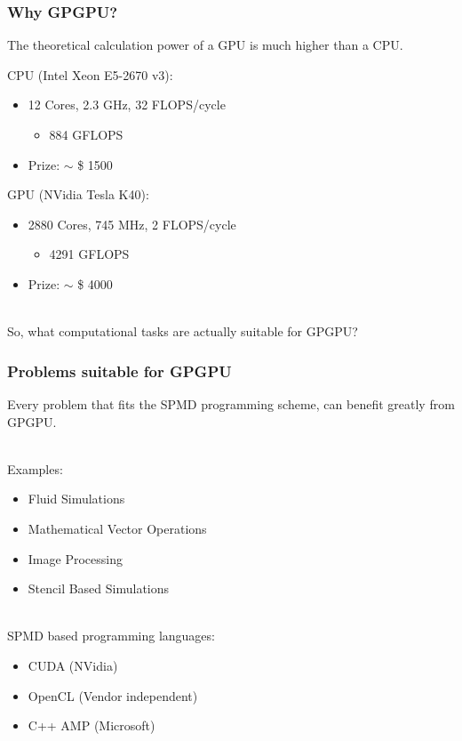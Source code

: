\documentclass{beamer}
\begin{document}
\begin{frame}
    \frametitle{Why GPGPU?}

    The \alert{theoretical} calculation power of a GPU is much higher
    than a CPU.

    \begin{example}
        CPU (Intel Xeon E5-2670 v3):
        \begin{itemize}
            \item 12 Cores, 2.3 GHz, 32 FLOPS/cycle
            \begin{itemize}
                \item \alert{884 GFLOPS}
            \end{itemize}
            \item Prize: $\sim$ \$ \alert{1500}
        \end{itemize}
        GPU (NVidia Tesla K40):
        \begin{itemize}
            \item 2880 Cores, 745 MHz, 2 FLOPS/cycle
            \begin{itemize}
                \item \alert{4291 GFLOPS}
            \end{itemize}
            \item Prize: $\sim$ \$ \alert{4000}
        \end{itemize}
    \end{example}
    ~\\
    So, what computational tasks are actually suitable for GPGPU?
\end{frame}

\begin{frame}
    \frametitle{Problems suitable for GPGPU}
    Every problem that fits the \alert{SPMD} programming scheme, can benefit greatly
    from GPGPU.
    
    ~\\ 
    Examples:
    \begin{itemize}
        \item Fluid Simulations
        \item Mathematical Vector Operations
        \item Image Processing
        \item Stencil Based Simulations 
    \end{itemize}
    
    ~\\
    SPMD based programming languages:
    \begin{itemize}
        \item CUDA (NVidia)
        \item OpenCL (Vendor independent)
        \item C++ AMP (Microsoft)
    \end{itemize}
\end{frame}
\end{document}
